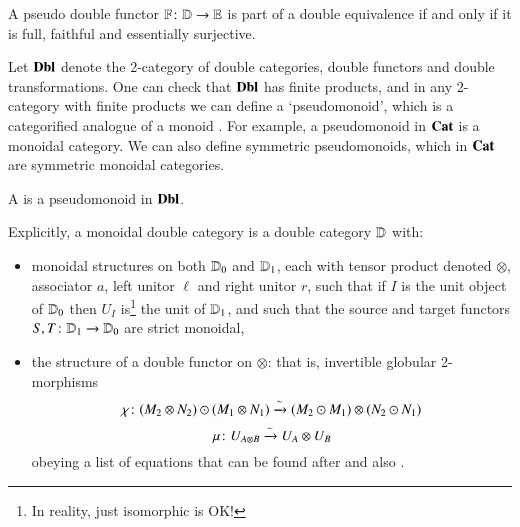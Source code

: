 \documentclass[reqno]{amsart}
\begin{document}
\begin{thm}{\cite[Theorem 7.8]{Shulman2008}}
\label{ShulDubEquiv}
A pseudo double functor $\mathbf{\mathbb F} \colon \mathbf{\mathbb D} \to \mathbf{\mathbb E}$ is part of a double equivalence if and only if it is full, faithful and essentially surjective.
\end{thm}

Let $\mathbf{Dbl}$ denote the 2-category of double categories, double functors and double transformations. One can check that $\mathbf{Dbl}$ has finite products, and in any 2-category with finite products we can define a `pseudomonoid', which is a categorified analogue of a monoid \cite{DS}. For example, a pseudomonoid in $\mathbf{Cat}$ is a monoidal category.   We can also define symmetric pseudomonoids, which in $\mathbf{Cat}$ are symmetric monoidal categories.

\begin{defn}
\label{defn:monoidal_double_category}
A  is a pseudomonoid in $\mathbf{Dbl}$. 
\end{defn} 
\noindent
Explicitly, a monoidal double category is a double category $\mathbf{\mathbb D}$ with:
\begin{itemize}
\item monoidal structures on both $\mathbf{\mathbb D}_0$ and $\mathbf{\mathbb D}_1$, each with tensor product denoted $\otimes$, associator $a$, left unitor $\ell$ and right unitor $r$, such that if $I$ is the unit object of $\mathbf{\mathbb D}_0$ then $U_I$ is\footnote{\chris In reality, just isomorphic is OK!} the unit of $\mathbf{\mathbb D}_1$, and such that the source and target functors $S,T \colon \mathbf{\mathbb D}_1 \to \mathbf{\mathbb D}_0$ are strict monoidal, 
\item the structure of a double functor on $\otimes$:
that is, invertible globular 2-morphisms
\[ \chi \colon (M_2\otimes N_2)\odot(M_1\otimes N_1)  \xrightarrow{\sim}
(M_2\odot M_1)\otimes (N_2\odot N_1)\]
\[ \mu \colon U_{A\otimes B} \xrightarrow{\sim} U_A \otimes U_B\]
obeying a list of equations that can be found after \cite[Definition 2.10]{HS} and also \cite[Definition A.5]{BC}.
\end{itemize}
\end{document}
